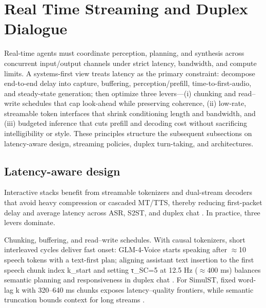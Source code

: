 \documentclass{article}
\begin{document}
\section{Real Time Streaming and Duplex Dialogue} \label{sec:realtimestreamingandduplexdialogue}

\noindent Real-time agents must coordinate perception, planning, and synthesis across concurrent input/output channels under strict latency, bandwidth, and compute limits. A systems-first view treats latency as the primary constraint: decompose end-to-end delay into capture, buffering, perception/prefill, time-to-first-audio, and steady-state generation; then optimize three levers---(i) chunking and read--write schedules that cap look-ahead while preserving coherence, (ii) low-rate, streamable token interfaces that shrink conditioning length and bandwidth, and (iii) budgeted inference that cuts prefill and decoding cost without sacrificing intelligibility or style. These principles structure the subsequent subsections on latency-aware design, streaming policies, duplex turn-taking, and architectures.



\subsection{Latency-aware design} \label{subsec:latency-awaredesign}

Interactive stacks benefit from streamable tokenizers and dual-stream decoders that avoid heavy compression or cascaded MT/TTS, thereby reducing first-packet delay and average latency across ASR, S2ST, and duplex chat \cite{li2025continuousspeechtokenizertext,har-tuv2025pastphoneticacousticspeechtokenizer,bai2025dmelspeechtokenizationmadesimple,zhao2024textlessstreamingspeechtranslationsemant,sheng2025syncspeechlowlatencyefficientdualstreamt}. In practice, three levers dominate.

Chunking, buffering, and read--write schedules. With causal tokenizers, short interleaved cycles deliver fast onset: GLM-4-Voice starts speaking after $\approx$10 speech tokens with a text-first plan; aligning assistant text insertion to the first speech chunk index k_start and setting τ_SC=5 at 12.5 Hz ($\approx$400 ms) balances semantic planning and responsiveness in duplex chat \cite{zeng2024glm4voicetowardsintelligenthumanlikeends,cui2025thinkbeforeyoutalkenhancingmeaningfuldia}. For SimulST, fixed word-lag k with 320--640 ms chunks exposes latency--quality frontiers, while semantic truncation bounds context for long streams \cite{guo2025streamuniachievingstreamingspeechtransla}.
\end{document}
